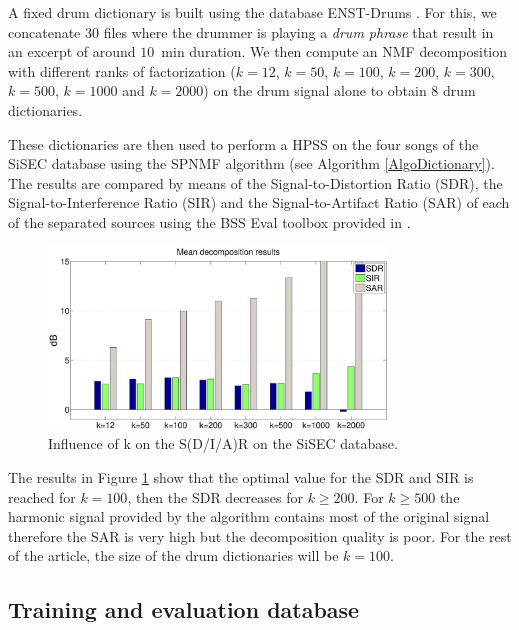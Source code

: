\documentclass{article}
\begin{document}
A fixed drum dictionary is built using the database ENST-Drums \cite{gillet2006enst}. For this, we  concatenate $30$ files where the drummer is playing a \emph{drum phrase} that result in an excerpt of around $10$~min duration. We then compute an NMF decomposition with different ranks of factorization ($k=12$, $k=50$, $k=100$, $k=200$, $k=300$, $k=500$, $k=1000$ and $k=2000$) on the drum signal alone to obtain $8$ drum dictionaries.

These dictionaries are then used to perform a HPSS on the four songs of the SiSEC database using the SPNMF algorithm (see Algorithm \ref{AlgoDictionary}). The results are compared by means of the Signal-to-Distortion Ratio (SDR), the Signal-to-Interference Ratio (SIR) and the Signal-to-Artifact Ratio (SAR) of each of the separated sources using the BSS Eval toolbox provided in \cite{bsseval}.

\begin{figure}[h]

  \centering 
  \includegraphics[width=9cm]{figs/AllDictSizeISMIR.eps}
  \caption{\label{dictsize}Influence of k on the S(D/I/A)R on the SiSEC database.}
  
\end{figure}

The results in Figure \ref{dictsize} show that the optimal value for the SDR and SIR is reached for $k=100$, then the SDR decreases for $k\geqslant 200$. For $k\geqslant 500$ the harmonic signal provided by the algorithm contains most of the original signal therefore the SAR is very high but the decomposition quality is poor. For the rest of the article, the size of the drum dictionaries will be $k=100$.

\subsection{Training and evaluation database}\label{database}
\end{document}
